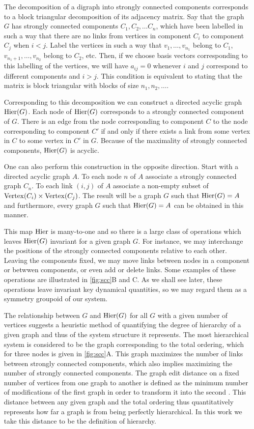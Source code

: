 The decomposition of a digraph into strongly connected components corresponds to a block triangular decomposition of its adjacency matrix.  Say that the graph $G$ has strongly connected components $C_1, C_2, \ldots C_n$, which have been labelled in such a way that there are no links from vertices in component $C_i$ to component $C_j$ when $i < j$.  Label the vertices in such a way that $v_1, \ldots, v_{n_1}$ belong to $C_1$, $v_{n_1 + 1}, \ldots, v_{n_2}$ belong to $C_2$, etc.  Then, if we choose basis vectors corresponding to this labelling of the vertices, we will have $a_{ij} = 0$ whenever $i$ and $j$ correspond to different components and $i > j$.  This condition is equivalent to stating that the matrix is block triangular with blocks of size $n_1, n_2, \ldots$.

Corresponding to this decomposition we can construct a directed acyclic graph $\mathrm{Hier} (G)$.  Each node of $\mathrm{Hier} (G)$ corresponds to a strongly connected component of $G$. There is an edge from the node corresponding to component $C$ to the node corresponding to component $C'$ if and only if there exists a link from some vertex in $C$ to some vertex in $C'$ in $G$.  Because of the maximality of strongly connected components, $\mathrm{Hier} (G)$ is acyclic.

One can also perform this construction in the opposite direction.  Start with a directed acyclic graph $A$.  To each node $n$ of $A$ associate
a strongly connected graph $C_n$.  To each link $(i,j)$ of $A$ associate a non-empty subset of $\mathrm{Vertex}(C_i) \times \mathrm{Vertex}(C_j)$.  The result will be a graph $G$ such that $\mathrm{Hier}(G) = A$ and furthermore, every graph $G$ such that $\mathrm{Hier}(G) = A$ can be obtained in this manner.

This map $\mathrm{Hier}$ is many-to-one and so there is a large class of
operations which leaves $\mathrm{Hier}(G)$ invariant for a given graph $G$.
For instance, we may interchange the positions of the strongly
connected components relative to each other.  Leaving the components
fixed, we may move links between nodes in a component or betwwen
components, or even add or delete links.  Some examples of these
operations are illustrated in \ref{fig:scc}B and C.  As we shall see
later, these operations leave invariant key dynamical quantities, so
we may regard them as a symmetry groupoid of our system.

The relationship between $G$ and $\mathrm{Hier}(G)$ for all $G$ with a given number of vertices suggests a heuristic method of quantifying the degree of hierarchy of a given graph and thus of the system structure it represents. The most hierarchical system is considered to be the graph corresponding to the total ordering, which for three nodes is given in \ref{fig:scc}A. This graph maximizes the number of links between strongly connected components, which also implies maximizing the number of strongly connected components. The graph edit distance on a fixed number of vertices from one graph to another is defined as the minimum number of modifications of the first graph in order to transform it into the second \cite{Axenovich2011}. This distance between any given graph and the total ordering thus quantitatively represents how far a graph is from being perfectly hierarchical. In this work we take this distance to be the definition of hierarchy.

